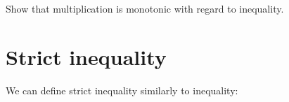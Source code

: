 Show that multiplication is monotonic with regard to inequality.

\begin{fence}
\begin{code}%
\>[0]\<%
\end{code}
\end{fence}

\hypertarget{Relations-strict-inequality}{%
\section{Strict inequality}\label{Relations-strict-inequality}}

We can define strict inequality similarly to inequality:

\begin{fence}
\begin{code}%
\>[0]\AgdaSpace{}%
\AgdaSpace{}%
\AgdaOperator{\AgdaDatatype{\AgdaUnderscore{}<\AgdaUnderscore{}}}\<%
\\
%
\\[\AgdaEmptyExtraSkip]%
\>[0]\AgdaSpace{}%
\AgdaOperator{\AgdaDatatype{\AgdaUnderscore{}<\AgdaUnderscore{}}}\AgdaSpace{}%
\AgdaSymbol{:}\AgdaSpace{}%
\AgdaSpace{}%
\AgdaSpace{}%
\AgdaSpace{}%
\AgdaSpace{}%
\AgdaSpace{}%
\<%
\\
%
\\[\AgdaEmptyExtraSkip]%
\>[0][@{}l@{\AgdaIndent{0}}]%
\>[2]%
\>[521I]\AgdaSymbol{:}\AgdaSpace{}%
\AgdaSpace{}%
\AgdaSymbol{\{}\AgdaSpace{}%
\AgdaSymbol{:}\AgdaSpace{}%
\AgdaSymbol{\}}\<%
\\
\>[.][@{}l@{}]\<[521I]%
\>[6]\AgdaComment{------------}\<%
\\
\>[2][@{}l@{\AgdaIndent{0}}]%
\>[4]\AgdaSpace{}%
\AgdaSpace{}%
\AgdaOperator{\AgdaDatatype{<}}\AgdaSpace{}%
\AgdaSpace{}%
\<%
\\
%
\\[\AgdaEmptyExtraSkip]%
%
\>[2]\AgdaSpace{}%
\AgdaSymbol{:}\AgdaSpace{}%
\AgdaSpace{}%
\AgdaSymbol{\{}\AgdaSpace{}%
\AgdaSpace{}%
\AgdaSymbol{:}\AgdaSpace{}%
\AgdaSymbol{\}}\<%
\\
\>[2][@{}l@{\AgdaIndent{0}}]%
\>[4]%
\>[536I]\AgdaSpace{}%
\AgdaOperator{\AgdaDatatype{<}}\AgdaSpace{}%
\<%
\\
\>[.][@{}l@{}]\<[536I]%
\>[6]\AgdaComment{-------------}\<%
\\
%
\>[4]\AgdaSpace{}%
\AgdaSpace{}%
\AgdaSpace{}%
\AgdaOperator{\AgdaDatatype{<}}\AgdaSpace{}%
\AgdaSpace{}%
\<%
\end{code}
\end{fence}

